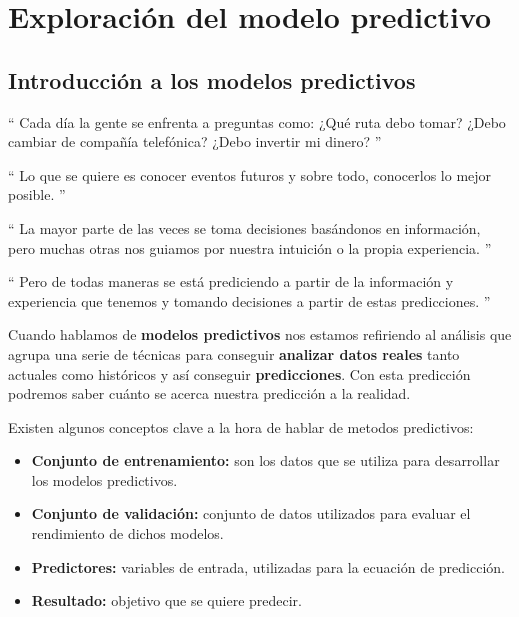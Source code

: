 \cleardoublepage

\chapter{Exploración del modelo predictivo}
\label{makereference4}

\section{Introducción a los modelos predictivos}
\label{makereference4.1}

 `` Cada día la gente se enfrenta a preguntas como: ¿Qué ruta debo tomar? ¿Debo cambiar de compañía telefónica? ¿Debo invertir mi dinero? ''
 
`` Lo que se quiere es conocer eventos futuros y sobre todo, conocerlos lo mejor posible. ''

`` La mayor parte de las veces se toma decisiones basándonos en información, pero muchas otras nos guiamos por nuestra intuición o la propia experiencia. ''

`` Pero de todas maneras se está prediciendo a partir de la información y experiencia que tenemos y tomando decisiones a partir de estas predicciones. '' 


Cuando hablamos de \textbf{modelos predictivos} nos estamos refiriendo al análisis que agrupa una serie de técnicas para conseguir \textbf{analizar datos reales} tanto actuales como históricos y así conseguir \textbf{predicciones}. Con esta predicción podremos saber cuánto se acerca nuestra predicción a la realidad.

Existen algunos conceptos clave a la hora de hablar de metodos predictivos:

\begin{itemize}
	\item \textbf{Conjunto de entrenamiento:} son los datos que se utiliza para desarrollar los modelos predictivos.
	\item \textbf{Conjunto de validación:} conjunto de datos utilizados para evaluar el rendimiento de dichos modelos.
	\item \textbf{Predictores:} variables de entrada, utilizadas para la ecuación de predicción. 
	\item \textbf{Resultado:} objetivo que se quiere predecir.
\end{itemize}

